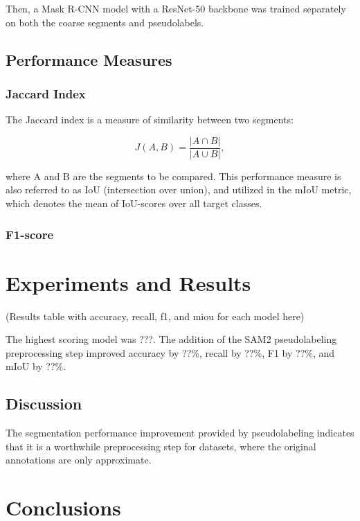 \documentclass[english, 12pt, a4paper, sci, utf8, a-2b, online]{aaltothesis}
\begin{document}
Then, a Mask R-CNN model with a ResNet-50 \cite{resnet} backbone was trained separately on both the coarse segments and pseudolabels.

\subsection{Performance Measures}

\subsubsection{Jaccard Index}

The Jaccard index\cite{jaccard} is a measure of similarity between two segments:

\begin{equation}
J(A, B) = \frac{|A \cap B|}{|A \cup B |},
\end{equation}

where A and B are the segments to be compared. This performance measure is also referred to as IoU (intersection over union), and utilized in the mIoU metric, which denotes the mean of IoU-scores over all target classes.

\subsubsection{F1-score}


\section{Experiments and Results}

(Results table with accuracy, recall, f1, and miou for each model here)

The highest scoring model was ???. The addition of the SAM2 pseudolabeling preprocessing step improved accuracy by ??\%, recall by ??\%, F1 by ??\%, and mIoU by ??\%.

\subsection{Discussion}

The segmentation performance improvement provided by pseudolabeling indicates that it is a worthwhile preprocessing step for datasets, where the original annotations are only approximate.

\section{Conclusions}

\clearpage

\thesisbibliography


\end{document}
